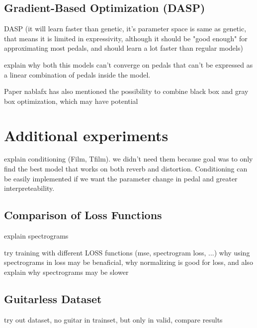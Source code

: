 \documentclass[masterthesis]{fer}
\begin{document}



\section{Gradient-Based Optimization (DASP)}

\cite{engel2020ddspdifferentiabledigitalsignal}

DASP (it will learn faster than genetic, it's parameter space is same as genetic, that means it is limited in expressivity, although it should be "good enough" for approximating most pedals, and should learn a lot faster than regular models)

explain why both this models can't converge on pedals that can't be expressed as a linear combination of pedals inside the model. 

Paper nablafx has also mentioned the possibility to combine black box and gray box optimization, which may have potential


\chapter{Additional experiments}
\label{sec:results_and_discussion}

explain conditioning (Film, Tfilm).
we didn't need them because goal was to only find the best model that works on both reverb and distortion. Conditioning can be easily implemented if we want the parameter change in pedal and greater interpreteability.


\section{Comparison of Loss Functions}
explain spectrograms

try training with different LOSS functions (mse, spectrogram loss, ...)
why using spectrograms in loss may be benaficial, why normalizing is good for loss, and also explain why spectrograms may be slower


\section{Guitarless Dataset}
try out dataset, no guitar in  trainset, but only in valid, compare results
\end{document}
